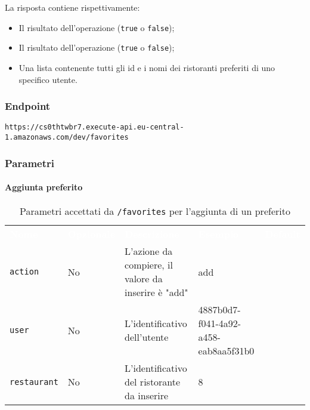 La risposta contiene rispettivamente:
\begin{itemize}
	\item Il risultato dell'operazione (\texttt{true} o \texttt{false});
    \item Il risultato dell'operazione (\texttt{true} o \texttt{false});
    \item Una lista contenente tutti gli id e i nomi dei ristoranti preferiti di uno specifico utente.
\end{itemize}

\subsubsection{Endpoint}
\texttt{https://cs0thtwbr7.execute-api.eu-central-1.amazonaws.com/dev/favorites}

\subsubsection{Parametri}

\paragraph{Aggiunta preferito}
\begin{table}[!htbp]
\renewcommand{\arraystretch}{1.5}

\begin{tabular}[t]{ m{}<{\centering}  m{}<{\centering} m{}<{\centering} m{}<{\centering}  m{}<{\centering} }
	\rowcolor{darkblue}
	\textcolor{white}{\textbf{Nome}} &\textcolor{white}{\textbf{Opzionale}} &\textcolor{white}{\textbf{Descrizione}} &\textcolor{white}{\textbf{Esempio}} &\textcolor{white}{\textbf{Default}} \\ 
\texttt{action} & No & L'azione da compiere, il valore da inserire è "add"  & add &  \\
\texttt{user} & No & L'identificativo dell'utente  & 4887b0d7-f041-4a92-a458-eab8aa5f31b0 &  \\
\texttt{restaurant} & No & L'identificativo del ristorante da inserire  & 8 &  \\
\end{tabular}
\caption{Parametri accettati da \texttt{/favorites} per l'aggiunta di un preferito}
\end{table}


